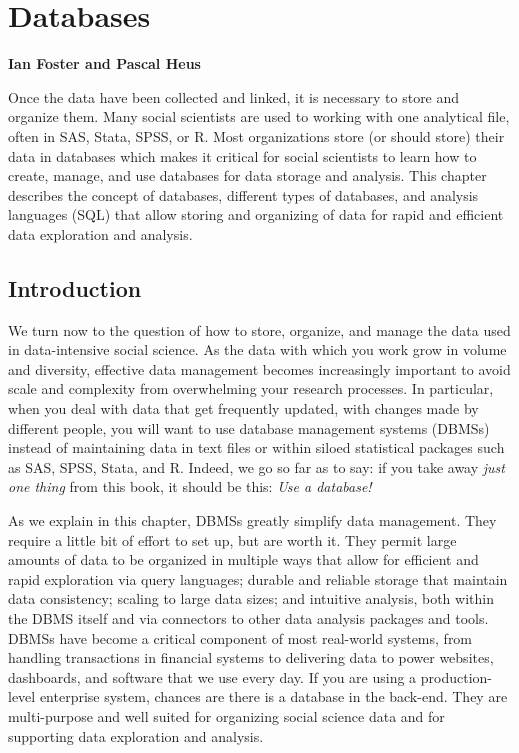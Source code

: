\documentclass[]{krantz}
\begin{document}
\chapter{Databases}\label{chap:db}

\textbf{Ian Foster and Pascal Heus}

Once the data have been collected and linked, it is necessary to store
and organize them. Many social scientists are used to working with one
analytical file, often in SAS, Stata, SPSS, or R. Most organizations
store (or should store) their data in databases which makes it critical
for social scientists to learn how to create, manage, and use databases
for data storage and analysis. This chapter describes the concept of
databases, different types of databases, and analysis languages (SQL)
that allow storing and organizing of data for rapid and efficient data
exploration and analysis.

\section{Introduction}\label{sec:db:intro}

We turn now to the question of how to store, organize, and manage the
data used in data-intensive social science. As the data with which you
work grow in volume and diversity, effective data management becomes
increasingly important to avoid scale and complexity from overwhelming
your research processes. In particular, when you deal with data that get
frequently updated, with changes made by different people, you will want
to use database management systems (DBMSs) instead of maintaining data
in text files or within siloed statistical packages such as SAS, SPSS,
Stata, and R. Indeed, we go so far as to say: if you take away
\emph{just one thing} from this book, it should be this: \emph{Use a
database!}

As we explain in this chapter, DBMSs greatly simplify data management.
They require a little bit of effort to set up, but are worth it. They
permit large amounts of data to be organized in multiple ways that allow
for efficient and rapid exploration via query languages; durable and
reliable storage that maintain data consistency; scaling to large data
sizes; and intuitive analysis, both within the DBMS itself and via
connectors to other data analysis packages and tools. DBMSs have become
a critical component of most real-world systems, from handling
transactions in financial systems to delivering data to power websites,
dashboards, and software that we use every day. If you are using a
production-level enterprise system, chances are there is a database in
the back-end. They are multi-purpose and well suited for organizing
social science data and for supporting data exploration and analysis.
\end{document}
